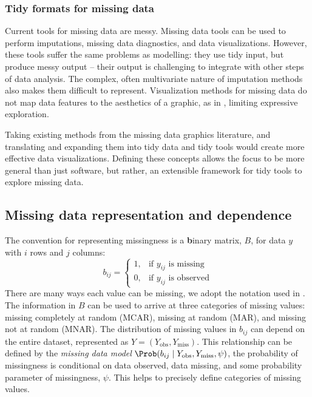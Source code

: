 \documentclass[article]{jss}
\begin{document}
\hypertarget{tidy-formats-missing-data}{%
\subsubsection{Tidy formats for missing data}\label{tidy-formats-missing-data}}

Current tools for missing data are messy.  Missing data tools can be used to
perform imputations, missing data diagnostics, and data visualizations.
However, these tools suffer the same problems as modelling: they use tidy
input, but produce messy output -- their output is challenging to integrate
with other steps of data analysis.  The complex, often multivariate nature
of imputation methods also makes them difficult to represent.  Visualization
methods for missing data do not map data features to the aesthetics of a
graphic, as in , limiting expressive exploration.

Taking existing methods from the missing data graphics literature, and
translating and expanding them into tidy data and tidy tools would create
more effective data visualizations.  Defining these concepts allows the
focus to be more general than just software, but rather, an extensible
framework for tidy tools to explore missing data.

\hypertarget{missing-data-rep-dep}{%
\subsection{Missing data representation and dependence}\label{missing-data-rep-dep}}

The convention for representing missingness is a \textbf{b}inary matrix,
\(B\), for data \(y\) with \(i\) rows and \(j\) columns:
%
\[
b_{ij} =\begin{cases}
1, & \text{if } y_{ij} \text{ is missing} \\
0, & \text{if } y_{ij} \text{ is observed}
\end{cases}
\]
%
There are many ways each value can be missing, we adopt the notation used in
\citep{vanBuuren2018}.  The information in \(B\) can be used to arrive at
three categories of missing values: missing completely at random (MCAR),
missing at random (MAR), and missing not at random (MNAR).  The distribution
of missing values in \(b_{ij}\) can depend on the entire dataset,
represented as \(Y = (Y_\text{obs}, Y_\text{miss})\).  This relationship can be
defined by the \emph{missing data model} \(\Prob(b_{ij} \mid Y_\text{obs}, Y_\text{miss},
\psi)\), the probability of missingness is conditional on data observed,
data missing, and some probability parameter of missingness, \(\psi\).  This
helps to precisely define categories of missing values.
\end{document}
